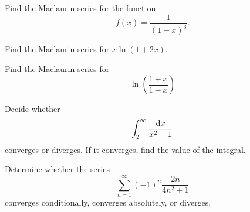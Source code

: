 \documentclass[12pt]{amsart}
\begin{document}
\vspace{3in}

\begin{thm}[25 Points]
  Find the Maclaurin series for the function
  \[f(x) = \frac{1}{(1-x)^3}.\]
\end{thm}

\newpage
\begin{thm}[25 Points]
  Find the Maclaurin series for \(x\ln(1 + 2x)\).
\end{thm}

\newpage


\begin{thm}[25 Points]
  Find the Maclaurin series for
  \[\ln\left(\frac{1 + x}{1 - x}\right)\]
\end{thm}

\newpage

\begin{thm}
  Decide whether 
  \[\int_2^\infty \frac{\dif x}{x^2 - 1}\]
  converges or diverges.
  If it converges, find the value of the integral.
\end{thm}

\vspace{3in}
\begin{thm}
  Determine whether the series
  \[\sum_{n = 1}^\infty (-1)^n\frac{2n}{4n^2 + 1}\]
  converges conditionally, converges absolutely, or diverges.
\end{thm}
\end{document}
